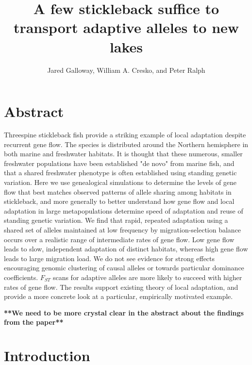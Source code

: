 \documentclass{article}
\begin{document}
\title{A few stickleback suffice to transport adaptive alleles to new lakes}
\author{Jared Galloway, William A. Cresko, and Peter Ralph}
\maketitle


\section*{Abstract}

Threespine stickleback fish provide a striking example of local adaptation despite recurrent gene flow.
The species is distributed around the Northern hemisphere in both marine and freshwater habitats.
It is thought that these numerous, smaller freshwater populations
have been established "de novo" from marine fish,
and that a shared freshwater phenotype
is often established using standing genetic variation.
Here we use genealogical simulations to determine the levels of gene flow
that best matches observed patterns of allele sharing among habitats in stickleback, 
and more generally to better understand how gene flow and local adaptation in large metapopulations
determine speed of adaptation and reuse of standing genetic variation.
We find that rapid, repeated adaptation using a shared set of alleles
maintained at low frequency by migration-selection balance
occurs over a realistic range of intermediate rates of gene flow.
Low gene flow leads to slow, independent adaptation of distinct habitats,
whereas high gene flow leads to large migration load.
We do not see evidence for strong effects encouraging genomic clustering of causal alleles
or towards particular dominance coefficients.
$F_{ST}$ scans for adaptive alleles are more likely to succeed with higher rates of gene flow.
The results support existing theory of local adaptation,
and provide a more concrete look at a particular, empirically motivated example.  

\textbf{**We need to be more crystal clear in the abstract about the findings from the paper**}

\section*{Introduction}

%
\end{document}
